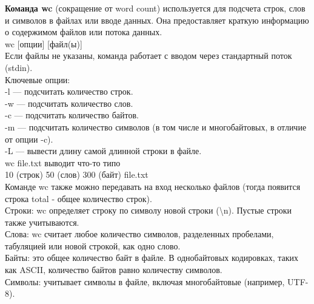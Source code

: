\noindent \textbf{Команда wc} (сокращение от word count) используется для подсчета строк, слов и символов в файлах или вводе данных. Она предоставляет краткую информацию о содержимом файлов или потока данных. \\
wc [опции] [файл(ы)] \\
Если файлы не указаны, команда работает с вводом через стандартный поток (stdin). \\
Ключевые опции: \\
-l — подсчитать количество строк. \\
-w — подсчитать количество слов. \\
-c — подсчитать количество байтов. \\
-m — подсчитать количество символов (в том числе и многобайтовых, в отличие от опции -c). \\
-L — вывести длину самой длинной строки в файле. \\
wc file.txt выводит что-то типо\\
10 (строк) 50 (слов) 300 (байт) file.txt \\
Команде wc также можно передавать на вход несколько файлов (тогда появится строка total - общее количество строк). \\
Строки: wc определяет строку по символу новой строки (\textbackslash n). Пустые строки также учитываются. \\
Слова: wc считает любое количество символов, разделенных пробелами, табуляцией или новой строкой, как одно слово. \\
Байты: это общее количество байт в файле. В однобайтовых кодировках, таких как ASCII, количество байтов равно количеству символов. \\
Символы: учитывает символы в файле, включая многобайтовые (например, UTF-8). \\
\newpage

